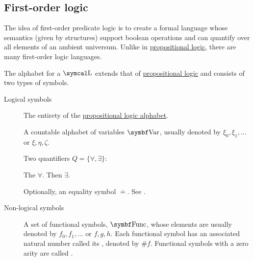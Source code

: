 \subsection{First-order logic}\label{subsec:first_order_logic}

\begin{definition}\label{def:first_order_logic_language}
  The idea of first-order predicate logic is to create a formal language whose semantics (given by structures) support boolean operations and can quantify over all elements of an ambient universum. Unlike in \hyperref[subsec:propositional_logic]{propositional logic}, there are many first-order logic languages.

  The alphabet for a  \( \CL \) extends that of \hyperref[subsec:propositional_logic]{propositional logic} and consists of two types of symbols.

  \begin{description}
    \item[Logical symbols]\mbox{}
    \begin{DefEnum}[series=def:first_order_logic_language]
       The entirety of the \hyperref[subsec:propositional_logic]{propositional logic alphabet}.

       A countable alphabet of variables \( \Bold{Var} \), usually denoted by \( \xi_0, \xi_1, \ldots \) or \( \xi, \eta, \zeta \).

       Two quantifiers \( Q = \{ \forall, \exists \} \):
      \begin{DefEnum}
         The  \( \forall \).
         Then  \( \exists \).
      \end{DefEnum}

       Optionally, an equality symbol \( \doteq \). See .
    \end{DefEnum}

    \item[Non-logical symbols]\mbox{}
    \begin{DefEnum}[resume=def:first_order_logic_language]
       A set of functional symbols, \( \Bold{Func} \), whose elements are usually denoted by \( f_0, f_1, \ldots \) or \( f, g, h \). Each functional symbol has an associated natural number called its , denoted by \( \# f \). Functional symbols with a zero arity are called .


\end{DefEnum}
\end{description}
\end{definition}
